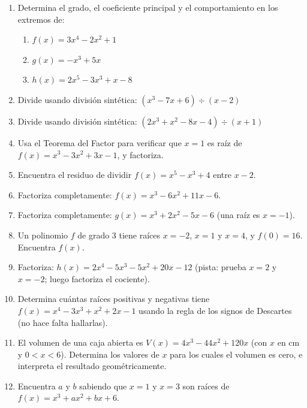 \documentclass[12pt, a4paper]{article}
\begin{document}
\begin{enumerate}[leftmargin=*]
  \item \facil{} Determina el grado, el coeficiente principal y el comportamiento en los extremos de:
        \begin{enumerate}[label=\alph*)]
          \item $f(x) = 3x^4 - 2x^2 + 1$
          \item $g(x) = -x^3 + 5x$
          \item $h(x) = 2x^5 - 3x^3 + x - 8$
        \end{enumerate}

  \item \facil{} Divide usando división sintética: $(x^3 - 7x + 6) \div (x - 2)$

  \item \facil{} Divide usando división sintética: $(2x^3 + x^2 - 8x - 4) \div (x + 1)$

  \item \facil{} Usa el Teorema del Factor para verificar que $x = 1$ es raíz de $f(x) = x^3 - 3x^2 + 3x - 1$, y factoriza.

  \item \medio{} Encuentra el residuo de dividir $f(x) = x^5 - x^3 + 4$ entre $x - 2$.

  \item \medio{} Factoriza completamente: $f(x) = x^3 - 6x^2 + 11x - 6$.

  \item \medio{} Factoriza completamente: $g(x) = x^3 + 2x^2 - 5x - 6$ (una raíz es $x = -1$).

  \item \medio{} Un polinomio $f$ de grado 3 tiene raíces $x = -2$, $x = 1$ y $x = 4$, y $f(0) = 16$. Encuentra $f(x)$.

  \item \dificil{} Factoriza: $h(x) = 2x^4 - 5x^3 - 5x^2 + 20x - 12$ (pista: prueba $x = 2$ y $x = -2$; luego factoriza el cociente).

  \item \dificil{} Determina cuántas raíces positivas y negativas tiene $f(x) = x^4 - 3x^3 + x^2 + 2x - 1$ usando la regla de los signos de Descartes (no hace falta hallarlas).

  \item \dificil{} El volumen de una caja abierta es $V(x) = 4x^3 - 44x^2 + 120x$ (con $x$ en cm y $0 < x < 6$). Determina los valores de $x$ para los cuales el volumen es cero, e interpreta el resultado geométricamente.

  \item \dificil{} Encuentra $a$ y $b$ sabiendo que $x = 1$ y $x = 3$ son raíces de $f(x) = x^3 + ax^2 + bx + 6$.
\end{enumerate}
\end{document}
